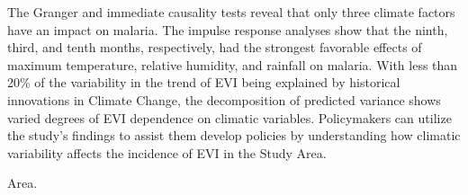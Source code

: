 The Granger and immediate causality tests reveal that only three climate factors have an impact on malaria. The impulse response analyses show that the ninth, third, and tenth months, respectively, had the strongest favorable effects of maximum temperature, relative humidity, and rainfall on malaria. With less than 20\% of the variability in the trend of EVI being explained by historical innovations in Climate Change, the decomposition of predicted variance shows varied degrees of EVI dependence on climatic variables. Policymakers can utilize the study's findings to assist them develop policies by understanding how climatic variability affects the incidence of EVI in the Study Area.

Area.
